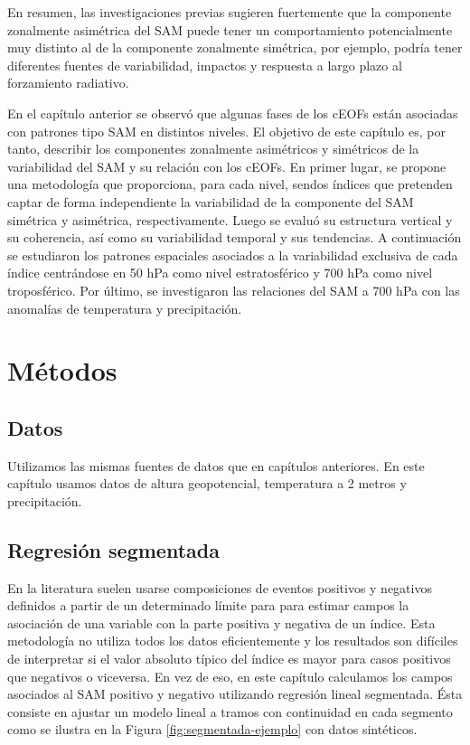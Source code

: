 \documentclass[12pt,oneside,a4paper]{reedthesis}
\begin{document}
En resumen, las investigaciones previas sugieren fuertemente que la componente zonalmente asimétrica del SAM puede tener un comportamiento potencialmente muy distinto al de la componente zonalmente simétrica, por ejemplo, podría tener diferentes fuentes de variabilidad, impactos y respuesta a largo plazo al forzamiento radiativo.

En el capítulo anterior se observó que algunas fases de los cEOFs están asociadas con patrones tipo SAM en distintos niveles.
El objetivo de este capítulo es, por tanto, describir los componentes zonalmente asimétricos y simétricos de la variabilidad del SAM y su relación con los cEOFs.
En primer lugar, se propone una metodología que proporciona, para cada nivel, sendos índices que pretenden captar de forma independiente la variabilidad de la componente del SAM simétrica y asimétrica, respectivamente.
Luego se evaluó su estructura vertical y su coherencia, así como su variabilidad temporal y sus tendencias.
A continuación se estudiaron los patrones espaciales asociados a la variabilidad exclusiva de cada índice centrándose en 50 hPa como nivel estratosférico y 700 hPa como nivel troposférico.
Por último, se investigaron las relaciones del SAM a 700 hPa con las anomalías de temperatura y precipitación.

\hypertarget{muxe9todos-2}{%
\section{Métodos}\label{muxe9todos-2}}

\hypertarget{datos-2}{%
\subsection{Datos}\label{datos-2}}

Utilizamos las mismas fuentes de datos que en capítulos anteriores.
En este capítulo usamos datos de altura geopotencial, temperatura a 2 metros y precipitación.

\hypertarget{regresiuxf3n-segmentada}{%
\subsection{Regresión segmentada}\label{regresiuxf3n-segmentada}}

En la literatura suelen usarse composiciones de eventos positivos y negativos definidos a partir de un determinado límite para para estimar campos la asociación de una variable con la parte positiva y negativa de un índice.
Esta metodología no utiliza todos los datos eficientemente y los resultados son difíciles de interpretar si el valor absoluto típico del índice es mayor para casos positivos que negativos o viceversa.
En vez de eso, en este capítulo calculamos los campos asociados al SAM positivo y negativo utilizando regresión lineal segmentada.
Ésta consiste en ajustar un modelo lineal a tramos con continuidad en cada segmento como se ilustra en la Figura \ref{fig:segmentada-ejemplo} con datos sintéticos.
\end{document}
